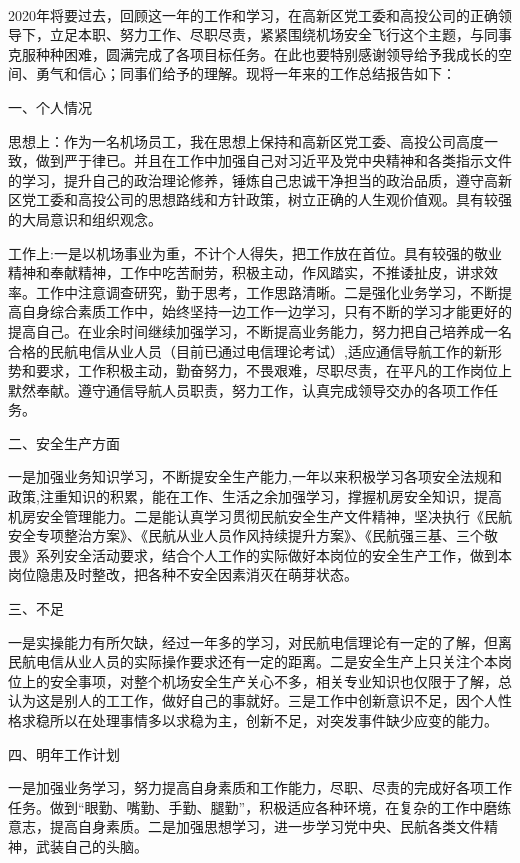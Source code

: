 \documentclass[a4paper,utf8,12pt]{ctexart}%
\begin{document}
\pagestyle{empty} %
\thispagestyle{empty}  %
\begin{center}
{\heiti{}}\\ %
\end{center}

\fangsong {}  2020年将要过去，回顾这一年的工作和学习，在高新区党工委和高投公司的正确领导下，立足本职、努力工作、尽职尽责，紧紧围绕机场安全飞行这个主题，与同事克服种种困难，圆满完成了各项目标任务。在此也要特别感谢领导给予我成长的空间、勇气和信心；同事们给予的理解。现将一年来的工作总结报告如下：

{\heiti 一、个人情况}\par %

 思想上：作为一名机场员工，我在思想上保持和高新区党工委、高投公司高度一致，做到严于律已。并且在工作中加强自己对习近平及党中央精神和各类指示文件的学习，提升自己的政治理论修养，锤炼自己忠诚干净担当的政治品质，遵守高新区党工委和高投公司的思想路线和方针政策，树立正确的人生观价值观。具有较强的大局意识和组织观念。\par
工作上:一是以机场事业为重，不计个人得失，把工作放在首位。具有较强的敬业精神和奉献精神，工作中吃苦耐劳，积极主动，作风踏实，不推诿扯皮，讲求效率。工作中注意调查研究，勤于思考，工作思路清晰。二是强化业务学习，不断提高自身综合素质工作中，始终坚持一边工作一边学习，只有不断的学习才能更好的提高自己。在业余时间继续加强学习，不断提高业务能力，努力把自己培养成一名合格的民航电信从业人员（目前已通过电信理论考试）,适应通信导航工作的新形势和要求，工作积极主动，勤奋努力，不畏艰难，尽职尽责，在平凡的工作岗位上默然奉献。遵守通信导航人员职责，努力工作，认真完成领导交办的各项工作任务。

{\heiti 二、安全生产方面}

一是加强业务知识学习，不断提安全生产能力,一年以来积极学习各项安全法规和政策,注重知识的积累，能在工作、生活之余加强学习，撑握机房安全知识，提高机房安全管理能力。二是能认真学习贯彻民航安全生产文件精神，坚决执行《民航安全专项整治方案》、《民航从业人员作风持续提升方案》、《民航强三基、三个敬畏》系列安全活动要求，结合个人工作的实际做好本岗位的安全生产工作，做到本岗位隐患及时整改，把各种不安全因素消灭在萌芽状态。

{\heiti 三、不足}

一是实操能力有所欠缺，经过一年多的学习，对民航电信理论有一定的了解，但离民航电信从业人员的实际操作要求还有一定的距离。二是安全生产上只关注个本岗位上的安全事项，对整个机场安全生产关心不多，相关专业知识也仅限于了解，总认为这是别人的工工作，做好自己的事就好。三是工作中创新意识不足，因个人性格求稳所以在处理事情多以求稳为主，创新不足，对突发事件缺少应变的能力。

{\heiti 四、明年工作计划}

一是加强业务学习，努力提高自身素质和工作能力，尽职、尽责的完成好各项工作任务。做到“眼勤、嘴勤、手勤、腿勤”，积极适应各种环境，在复杂的工作中磨练意志，提高自身素质。二是加强思想学习，进一步学习党中央、民航各类文件精神，武装自己的头脑。\par

~\\[50pt] %
\end{document}

